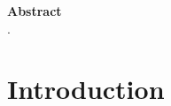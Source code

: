\begin{mybox}
    \textbf{Abstract} \\
    \small
    \lipsum[1].
\end{mybox}

\section{Introduction}
\label{ch2:intro}
\lipsum[2]
